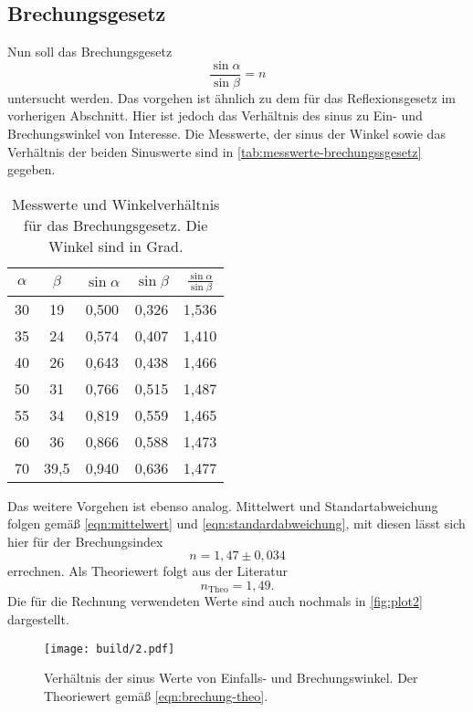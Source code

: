 \subsection{Brechungsgesetz}
\label{sec:Brechungsgesetz}
Nun soll das Brechungsgesetz
\begin{equation}
	\frac{\sin\alpha}{\sin\beta} = n
	\label{eqn:ausw:brechungsgesetz}
\end{equation}
untersucht werden. Das vorgehen ist ähnlich zu dem für das Reflexionsgesetz im vorherigen
Abschnitt. Hier ist jedoch das Verhältnis des sinus zu Ein- und Brechungswinkel von
Interesse. Die Messwerte, der sinus der Winkel sowie das Verhältnis der beiden Sinuswerte
sind in \autoref{tab:messwerte-brechungssgesetz} gegeben.
\begin{table}
	\centering
	\caption{Messwerte und Winkelverhältnis für das Brechungsgesetz. Die Winkel sind
	in Grad.}
	\label{tab:messwerte-brechungssgesetz}
	\begin{tabular}{c c c c c}
		\toprule
		$\alpha$ &
		$\beta$ &
		$\sin\alpha$ &
		$\sin\beta$ &
		$\frac{\sin\alpha}{\sin\beta}$ \\
		\midrule
		30 & 19   & 0,500 & 0,326 & 1,536	\\
		35 & 24   & 0,574 & 0,407 & 1,410	\\
		40 & 26   & 0,643 & 0,438 & 1,466	\\
		50 & 31   & 0,766 & 0,515 & 1,487	\\
		55 & 34   & 0,819 & 0,559 & 1,465	\\
		60 & 36   & 0,866 & 0,588 & 1,473	\\
		70 & 39,5 & 0,940 & 0,636 & 1,477	\\
		\bottomrule
	\end{tabular}
\end{table}
Das weitere Vorgehen ist ebenso analog. Mittelwert und Standartabweichung folgen gemäß
\autoref{eqn:mittelwert} und \autoref{eqn:standardabweichung}, mit diesen lässt sich hier
für der Brechungsindex
\begin{equation}
	n = 1,47 \pm 0,034
	\label{eqn:brechung-exp}
\end{equation}
errechnen. Als Theoriewert folgt aus der Literatur
\begin{equation}
	n_\text{Theo} = 1,49.
	\label{eqn:brechung-theo}
\end{equation}
Die für die Rechnung verwendeten Werte sind auch nochmals in \autoref{fig:plot2} dargestellt.
\begin{figure}[H]
	\centering
	\texttt{[image: build/2.pdf]}
	\caption{Verhältnis der sinus Werte von Einfalls- und Brechungswinkel. Der
	Theoriewert gemäß \autoref{eqn:brechung-theo}.}
	\label{fig:plot2}
\end{figure}

